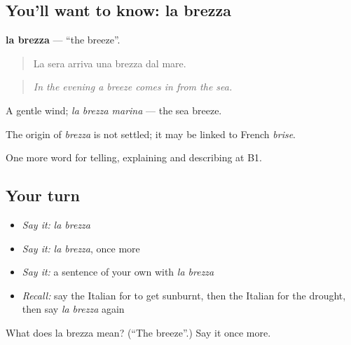 \subsection*{You'll want to know: la brezza}
\textbf{la brezza} — \textquotedblleft{}the breeze\textquotedblright{}.

\begin{quote}
La sera arriva una brezza dal mare.
\end{quote}

\begin{quote}
\emph{In the evening a breeze comes in from the sea.}
\end{quote}

A gentle wind; \emph{la brezza marina} — the sea breeze.

\begin{cousinweb}
The origin of \emph{brezza} is not settled; it may be linked to French \emph{brise}.
\end{cousinweb}

\begin{grammarlens}[title={What you've built}]
One more word for telling, explaining and describing at B1.
\end{grammarlens}

\subsection*{Your turn}
\begin{itemize}
\raggedright
  \item \emph{Say it:} \emph{la brezza}
  \item \emph{Say it:} \emph{la brezza}, once more
  \item \emph{Say it:} a sentence of your own with \emph{la brezza}
  \item \emph{Recall:} say the Italian for to get sunburnt, then the Italian for the drought, then say \emph{la brezza} again
\end{itemize}

\begin{tcolorbox}[breakable,colback=teal!4,colframe=teal!35!black,title={Before you move on}]
What does la brezza mean? (\textquotedblleft{}The breeze\textquotedblright{}.) Say it once more.
\end{tcolorbox}
